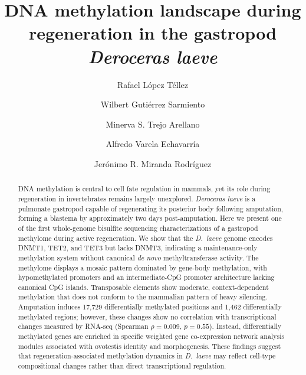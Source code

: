 \documentclass[12pt]{article}
\begin{document}
\title{\Large DNA methylation landscape during regeneration in the gastropod \textit{Deroceras laeve}}

\author[1]{Rafael L\'{o}pez T\'{e}llez}
\author[1]{Wilbert Guti\'{e}rrez Sarmiento}
\author[2]{Minerva S. Trejo Arellano}
\author[1]{Alfredo Varela Echavarr\'{i}a}
\author[1,*]{Jer\'{o}nimo R. Miranda Rodr\'{i}guez}


\date{}
\maketitle
\thispagestyle{empty}

\begin{abstract}
\noindent
DNA methylation is central to cell fate regulation in mammals, yet its role during regeneration in invertebrates remains largely unexplored. \textit{Deroceras laeve} is a pulmonate gastropod capable of regenerating its posterior body following amputation, forming a blastema by approximately two days post-amputation. Here we present one of the first whole-genome bisulfite sequencing characterizations of a gastropod methylome during active regeneration. We show that the \textit{D.\ laeve} genome encodes DNMT1, TET2, and TET3 but lacks DNMT3, indicating a maintenance-only methylation system without canonical \textit{de novo} methyltransferase activity. The methylome displays a mosaic pattern dominated by gene-body methylation, with hypomethylated promoters and an intermediate-CpG promoter architecture lacking canonical CpG islands. Transposable elements show moderate, context-dependent methylation that does not conform to the mammalian pattern of heavy silencing. Amputation induces 17,729 differentially methylated positions and 1,462 differentially methylated regions; however, these changes show no correlation with transcriptional changes measured by RNA-seq (Spearman $\rho = 0.009$, $p = 0.55$). Instead, differentially methylated genes are enriched in specific weighted gene co-expression network analysis modules associated with ovotestis identity and morphogenesis. These findings suggest that regeneration-associated methylation dynamics in \textit{D.\ laeve} may reflect cell-type compositional changes rather than direct transcriptional regulation.
\end{abstract}
\end{document}
